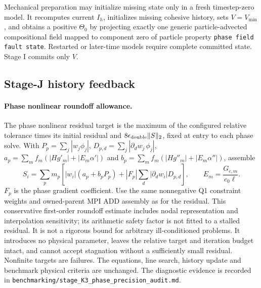 \documentclass[11pt]{article}
\begin{document}
Mechanical preparation may initialize missing state only in a fresh
timestep-zero model. It recomputes current $I_h$, initializes missing cohesive
history, sets $V=V_{\min}$, and obtains a positive $\Theta_0$ by projecting
exactly one generic particle-advected compositional field mapped to component
zero of particle property \texttt{phase field fault state}. Restarted or
later-time models require complete committed state. Stage I commits only $V$.

\subsection{Stage-J history feedback}

\paragraph{Phase nonlinear roundoff allowance.}
The phase nonlinear residual target is the maximum of the configured relative
tolerance times its initial residual and $8\epsilon_{\rm double}\|S\|_2$,
fixed at entry to each phase solve. With
$P_p=\sum_j|w_j\phi_j|$, $D_{p,d}=\sum_j|\partial_dw_j\,\phi_j|$,
$a_p=\sum_mf_m(|Hg'_m|+|E_m\alpha'|)$ and
$b_p=\sum_mf_m(|Hg''_m|+|E_m\alpha''|)$, assemble
\[
 S_i=\sum_pm_p\left[|w_i|(a_p+b_pP_p)
             +|F_p|\sum_d|\partial_dw_i|D_{p,d}\right],
 \qquad E_m=\frac{G_{c,m}}{c_0\ell}.
\]
$F_p$ is the phase gradient coefficient. Use the same nonnegative Q1
constraint weights and owned-parent MPI ADD assembly as for the residual.
This conservative first-order roundoff estimate includes nodal representation
and interpolation sensitivity; its arithmetic safety factor is not fitted to
a stalled residual. It is not a rigorous bound for arbitrary ill-conditioned
problems. It introduces no physical parameter, leaves the relative target and
iteration budget intact, and cannot accept stagnation without a sufficiently
small residual. Nonfinite targets are failures. The equations, line search,
history update and benchmark physical criteria are unchanged. The diagnostic
evidence is recorded in
\texttt{benchmarking/stage\_K3\_phase\_precision\_audit.md}.
\end{document}
